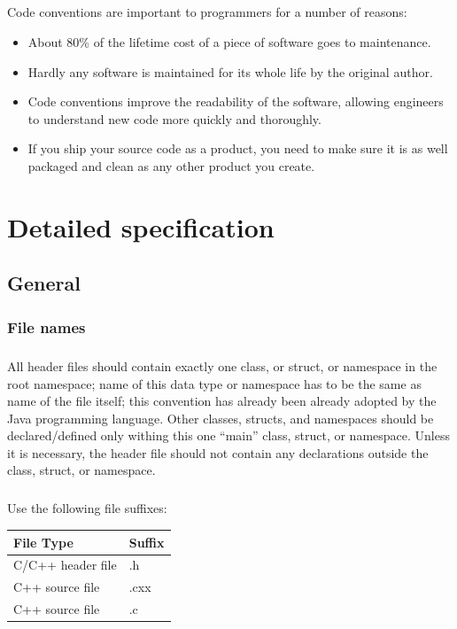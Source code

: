\documentclass[a4paper,twoside,15pt]{book}
\begin{document}
    \paragraph{}
    Code conventions are important to programmers for a number of reasons:
    \begin{itemize}
        \item About 80\% of the lifetime cost of a piece of software goes to maintenance.
        \item Hardly any software is maintained for its whole life by the original author.
        \item Code conventions improve the readability of the software, allowing engineers to understand new code more quickly and thoroughly.
        \item If you ship your source code as a product, you need to make sure it is as well packaged and clean as any other product you create.
    \end{itemize}

\chapter{Detailed specification}
    \section{General}
        \subsection{File names}
            \paragraph{}
            All header files should contain exactly one class, or struct, or namespace in the root namespace; name of this data type or namespace has to be the same as name of the file itself; this convention has already been already adopted by the Java programming language. Other classes, structs, and namespaces should be declared/defined only withing this one ``main'' class, struct, or namespace. Unless it is necessary, the header file should not contain any declarations outside the class, struct, or namespace.

            \paragraph{}
            Use the following file suffixes:\\
            \begin{table}[h!]
                \begin{tabular}{l|l}
                    \textbf{File Type}  & \textbf{Suffix} \\\hline
                    C/C++ header file   & .h              \\
                    C++ source file     & .cxx            \\
                    C++ source file     & .c
                \end{tabular}
            \end{table}
\end{document}
